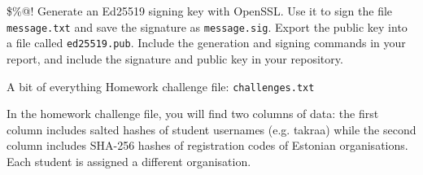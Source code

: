 \documentclass{homework}
\begin{document}
\begin{task}{\$\%@!}
  Generate an Ed25519 signing key with OpenSSL.
  Use it to sign the file \texttt{message.txt} and save the signature as \texttt{message.sig}.
  Export the public key into a file called \texttt{ed25519.pub}.
  Include the generation and signing commands in your report, and include the signature and public key in your repository.
\end{task}

\newpage

\begin{task}{A bit of everything}
  Homework challenge file: \texttt{challenges.txt}

  In the homework challenge file, you will find two columns of data: the first column includes salted hashes of student usernames (e.g. takraa) while the second column includes SHA-256 hashes of registration codes of Estonian organisations.
  Each student is assigned a different organisation.


\end{task}
\end{document}
